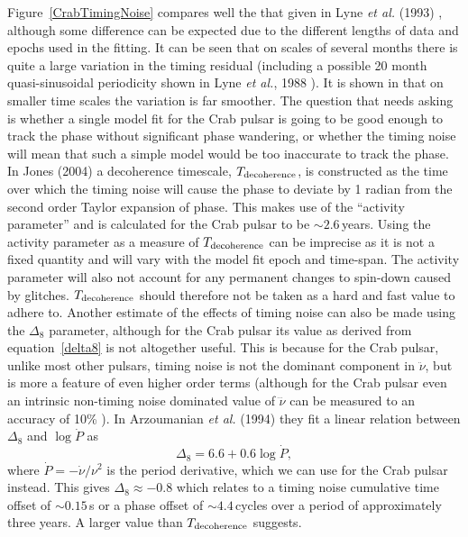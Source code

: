 Figure~\ref{CrabTimingNoise} compares well the that given in Lyne {\it et al.} (1993)
\cite{Lyne:1993}, although some difference can be expected due to the different lengths of data and
epochs used in the fitting. It can be seen that on scales of several months there is quite a large
variation in the timing residual (including a possible 20 month quasi-sinusoidal periodicity shown
in Lyne {\it et al.}, 1988 \cite{Lyne:1988}). It is shown in \cite{Lyne:1993} that on smaller time
scales the variation is far smoother. The question that needs asking is whether a single model fit
for the Crab pulsar is going to be good enough to track the phase without significant phase
wandering, or whether the timing noise will mean that such a simple model would be too inaccurate to
track the phase. In Jones (2004) \cite{Jones:2004} a decoherence timescale, $T_{\rm{decoherence}}$,
is constructed as the time over which the timing noise will cause the phase to deviate by 1 radian
from the second order Taylor expansion of phase. This makes use of the ``activity parameter'' and is
calculated for the Crab pulsar to be $\sim 2.6$\,years. Using the activity parameter as a measure of
$T_{\rm{decoherence}}$ can be imprecise as it is not a fixed quantity and will vary with the model
fit epoch and time-span. The activity parameter will also not account for any permanent changes to
spin-down caused by glitches. $T_{\rm{decoherence}}$ should therefore not be taken as a hard and
fast value to adhere to. Another estimate of the effects of timing noise can also be made using the
$\Delta_8$ parameter, although for the Crab pulsar its value as derived from equation~\ref{delta8}
is not altogether useful. This is because for the Crab pulsar, unlike most other pulsars, timing
noise is not the dominant component in $\ddot{\nu}$, but is more a feature of even higher order
terms (although for the Crab pulsar even an intrinsic non-timing noise dominated value of
$\dddot{\nu}$ can be measured to an accuracy of 10\% \cite{PulsarAstronomy}). In Arzoumanian {\it et
al.} (1994) \cite{Arzoumanian:1994} they fit a linear relation between $\Delta_8$ and
$\log{\dot{P}}$ as
\begin{equation}\label{delta8slope}
\Delta_8 = 6.6 + 0.6\log{\dot{P}},
\end{equation}
where $\dot{P} = -\dot{\nu}/\nu^2$ is the period derivative, which we can use for the Crab pulsar
instead. This gives $\Delta_8 \approx -0.8$ which relates to a timing noise cumulative time offset
of $\sim 0.15$\,s or a phase offset of $\sim 4.4$\,cycles over a period of approximately three
years. A larger value than $T_{\rm{decoherence}}$ suggests.

